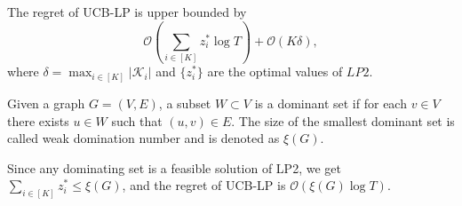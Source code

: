 The regret of UCB-LP is upper bounded by 
\begin{equation}
\label{eqn:UCBLPUpperBound}
\mathcal{O}\left(\sum_{i\in [K]} z_i^* \log T\right) +\mathcal{O}(K\delta),
\end{equation}
where $\delta= \max_{i \in [K]}|\mathcal{K}_i|$ and $\{z_i^*\}$ are the optimal values of $LP2$. 
\begin{definition}
	Given a graph $G=(V,E)$, a subset $W\subset V$ is a dominant set if for each $v\in V$ there exists $u \in W$ such that $(u,v)\in E$. The size of the smallest dominant set is called weak domination number and is denoted as $\xi(G)$. 
\end{definition} 	
Since any dominating set is a feasible solution of LP2, we get $\sum_{i\in [K]}z_i^*\leq \xi(G)$, and the regret of UCB-LP is $\mathcal{O}(\xi(G)\log T)$. 
  
